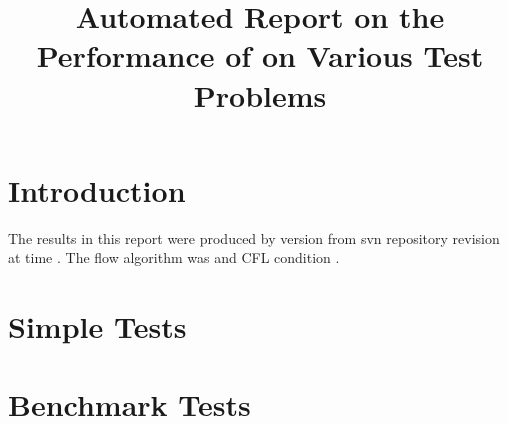 \documentclass[11pt,a4paper]{report}
\begin{document}
 

\title{Automated Report on the Performance of \anuga{} on Various Test Problems}
\maketitle
\tableofcontents

\chapter{Introduction}

The results in this report were produced by \anuga{} version \majorR{} 
from svn repository revision \minorR{} at time \timeR.
The flow algorithm was \alg{} and CFL condition \cfl.

\chapter{Simple Tests}








\chapter{Benchmark Tests}





\appendix
\end{document}
